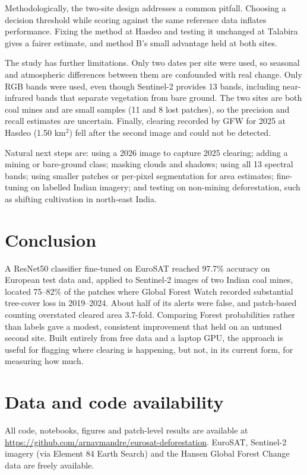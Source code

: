 \documentclass[11pt]{article}
\begin{document}
Methodologically, the two-site design addresses a common pitfall. Choosing a decision threshold while scoring against the same reference data inflates performance. Fixing the method at Hasdeo and testing it unchanged at Talabira gives a fairer estimate, and method B's small advantage held at both sites.

The study has further limitations. Only two dates per site were used, so seasonal and atmospheric differences between them are confounded with real change. Only RGB bands were used, even though Sentinel-2 provides 13 bands, including near-infrared bands that separate vegetation from bare ground. The two sites are both coal mines and are small samples (11 and 8 lost patches), so the precision and recall estimates are uncertain. Finally, clearing recorded by GFW for 2025 at Hasdeo (1.50 km$^2$) fell after the second image and could not be detected.

Natural next steps are: using a 2026 image to capture 2025 clearing; adding a mining or bare-ground class; masking clouds and shadows; using all 13 spectral bands; using smaller patches or per-pixel segmentation for area estimates; fine-tuning on labelled Indian imagery; and testing on non-mining deforestation, such as shifting cultivation in north-east India.

\section{Conclusion}

A ResNet50 classifier fine-tuned on EuroSAT reached 97.7\% accuracy on European test data and, applied to Sentinel-2 images of two Indian coal mines, located 75--82\% of the patches where Global Forest Watch recorded substantial tree-cover loss in 2019--2024. About half of its alerts were false, and patch-based counting overstated cleared area 3.7-fold. Comparing Forest probabilities rather than labels gave a modest, consistent improvement that held on an untuned second site. Built entirely from free data and a laptop GPU, the approach is useful for flagging where clearing is happening, but not, in its current form, for measuring how much.

\section*{Data and code availability}
All code, notebooks, figures and patch-level results are available at \url{https://github.com/arnavmandre/eurosat-deforestation}. EuroSAT, Sentinel-2 imagery (via Element 84 Earth Search) and the Hansen Global Forest Change data are freely available.
\end{document}

